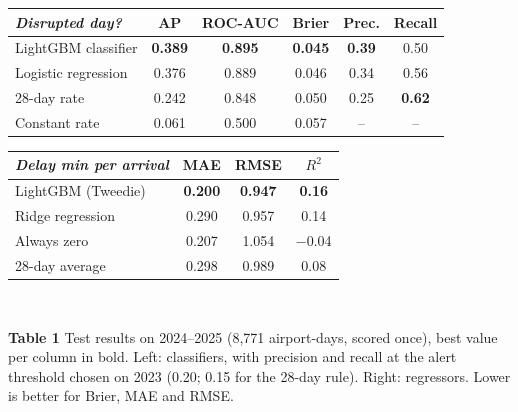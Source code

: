 \documentclass[10pt,a4paper,epsf,apalike]{article}
\begin{document}
\vspace{0.2em}
\begin{center}
{\footnotesize\linespread{1.1}\selectfont\setlength{\tabcolsep}{4pt}
\begin{minipage}[t]{0.56\linewidth}\centering
\begin{tabular}{@{}lccccc@{}}
\toprule
\textit{Disrupted day?} & AP & ROC-AUC & Brier & Prec. & Recall\\
\midrule
LightGBM classifier & \textbf{0.389} & \textbf{0.895} & \textbf{0.045} & \textbf{0.39} & 0.50\\
Logistic regression & 0.376 & 0.889 & 0.046 & 0.34 & 0.56\\
28-day rate & 0.242 & 0.848 & 0.050 & 0.25 & \textbf{0.62}\\
Constant rate & 0.061 & 0.500 & 0.057 & -- & --\\
\bottomrule
\end{tabular}
\end{minipage}\hfill
\begin{minipage}[t]{0.41\linewidth}\centering
\begin{tabular}{@{}lccc@{}}
\toprule
\textit{Delay min per arrival} & MAE & RMSE & $R^2$\\
\midrule
LightGBM (Tweedie) & \textbf{0.200} & \textbf{0.947} & \textbf{0.16}\\
Ridge regression & 0.290 & 0.957 & 0.14\\
Always zero & 0.207 & 1.054 & $-$0.04\\
28-day average & 0.298 & 0.989 & 0.08\\
\bottomrule
\end{tabular}
\end{minipage}\\[0.5em]
\begin{minipage}{\linewidth}
\textbf{Table 1} Test results on 2024--2025 (8,771 airport-days, scored once), best value per column in bold. Left: classifiers, with precision and recall at the alert threshold chosen on 2023 (0.20; 0.15 for the 28-day rule). Right: regressors. Lower is better for Brier, MAE and RMSE.\par
\end{minipage}
}
\end{center}
\end{document}
